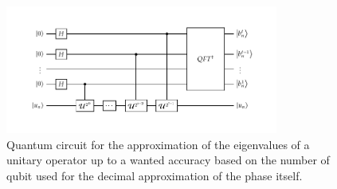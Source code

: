 \begin{figure}[t]
    \centering
    \includegraphics[width=0.8\textwidth]{Immagini/Phase.pdf}
    \caption
    {
        Quantum circuit for the approximation of the eigenvalues of a unitary operator up to a wanted accuracy based on the number of qubit used for the decimal approximation of the phase itself.
    }
    \label{fig:Phase}
\end{figure}

